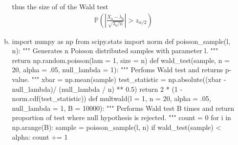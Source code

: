 \documentclass[a4paper,10pt]{article}
\theoremstyle{definition}
\begin{document}
\begin{enumerate}
\begin{enumerate}[(a)]
thus the size of of the Wald test
\begin{align*}
\mathbb{P}\left(\left|\frac{\overline{X}_n-\lambda_0}{\sqrt{\lambda_0/n}}\right|>z_{\alpha/2}\right)
\end{align*}
\item 
\begin{python}
import numpy as np
from scipy.stats import norm
def poisson_sample(l, n):
    """
    Generates n Poisson distributed samples with parameter l.
    """
    return np.random.poisson(lam = 1, size = n)
def wald_test(sample, n = 20, alpha = .05, null_lambda = 1):
    """
    Perfoms Wald test and returns p-value.
    """
    xbar = np.mean(sample)
    test_statistic = np.absolute((xbar - null_lambda)/ (null_lambda / n) ** 0.5)
    return  2 * (1 - norm.cdf(test_statistic))
def multwald(l = 1, n = 20, alpha = .05, null_lambda = 1, B = 10000):
    """
    Performs Wald test B times and return proportion of test where null hypothesis is rejected.
    """
    count = 0
    for i in np.arange(B):
        sample = poisson_sample(l, n)
        if wald_test(sample) < alpha:
            count += 1


\end{python}
\end{enumerate}
\end{enumerate}
\end{document}
